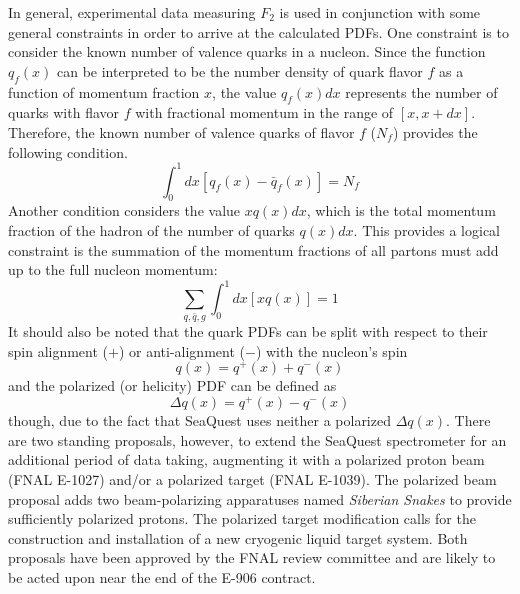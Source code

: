 In general, experimental data measuring $F_2$ is used in conjunction with some general constraints in order to arrive at the calculated PDFs. One constraint is to consider the known number of valence quarks in a nucleon. Since the function $q_f(x)$ can be interpreted to be the number density of quark flavor $f$ as a function of momentum fraction $x$, the value $q_f(x)dx$ represents the number of quarks with flavor $f$ with fractional momentum in the range of $[x,x+dx]$. Therefore, the known number of valence quarks of flavor $f$ ($N_f$) provides the following condition.
\begin{equation}
\int_0^1 dx [q_f(x) - \bar{q}_f(x)] = N_{f}
\label{eq:vsr}
\end{equation}
Another condition considers the value $x q(x) dx$, which is the total momentum fraction of the hadron of the number of quarks $q(x)dx$. This provides a logical constraint is the summation of the momentum fractions of all partons must add up to the full nucleon momentum:
\begin{equation}
\sum_{q,\bar{q},g} \int_0^1 dx [x q(x)] = 1
\end{equation}
It should also be noted that the quark PDFs can be split with respect to their spin alignment ($+$) or anti-alignment ($-$) with the nucleon's spin
\begin{equation}
q(x) = q^+(x) + q^-(x)
\end{equation}
and the polarized (or helicity) PDF can be defined as
\begin{equation}
\Delta q(x) = q^+(x) - q^-(x)
\end{equation}
though, due to the fact that SeaQuest uses neither a polarized $\Delta q(x)$. There are two standing proposals, however, to extend the SeaQuest spectrometer for an additional period of data taking, augmenting it with a polarized proton beam (FNAL E-1027) and/or a polarized target (FNAL E-1039). The polarized beam proposal adds two beam-polarizing apparatuses named \emph{Siberian Snakes} to provide sufficiently polarized protons. The polarized target modification calls for the construction and installation of a new cryogenic liquid target system. Both proposals have been approved by the FNAL review committee and are likely to be acted upon near the end of the E-906 contract.

